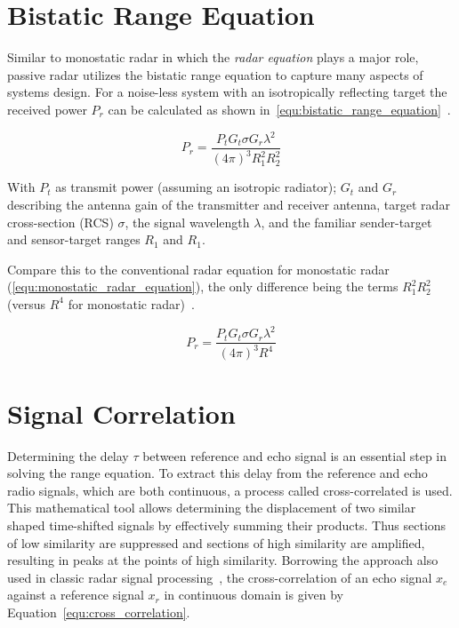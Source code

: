 \section{Bistatic Range Equation}

Similar to monostatic radar in which the \emph{radar equation} plays a major role, passive radar utilizes the bistatic range equation to capture many aspects of systems design. For a noise-less system with an isotropically reflecting target the received power \(P_{r}\) can be calculated as shown in~\ref{equ:bistatic_range_equation}~\cite[p.~20]{Malanowski2019}.

\begin{equation}\label{equ:bistatic_range_equation}
    P_{r} = \frac{P_{t} G_{t} \sigma G_{r} \lambda^2}{{\left(4 \pi \right)}^3 R_{1}^2 R_{2}^2}
\end{equation}

With \(P_{t}\) as transmit power (assuming an isotropic radiator); \(G_{t}\) and \(G_{r}\) describing the antenna gain of the transmitter and receiver antenna, target radar cross-section (RCS) \(\sigma\), the signal wavelength \(\lambda\), and the familiar sender-target and sensor-target ranges \(R_{1}\) and \(R_{1}\).

Compare this to the conventional radar equation for monostatic radar (\ref{equ:monostatic_radar_equation}), the only difference being the terms \(R_{1}^2 R_{2}^2\) (versus \(R^4\) for monostatic radar)~\cite[p.~4]{Kloeck2019}.

\begin{equation}\label{equ:monostatic_radar_equation}
    P_{r} = \frac{P_{t} G_{t} \sigma G_{r} \lambda^2}{{\left(4 \pi \right)}^3 R^4}
\end{equation}

\section{Signal Correlation}

Determining the delay \(\tau\) between reference and echo signal is an essential step in solving the range equation. To extract this delay from the reference and echo radio signals, which are both continuous, a process called cross-correlated is used. This mathematical tool allows determining the displacement of two similar shaped time-shifted signals by effectively summing their products. Thus sections of low similarity are suppressed and sections of high similarity are amplified, resulting in peaks at the points of high similarity. Borrowing the approach also used in classic radar signal processing~\cite{Richards2014}, the cross-correlation of an echo signal \(x_e\) against a reference signal \(x_r\) in continuous domain is given by Equation~\ref{equ:cross_correlation}.

